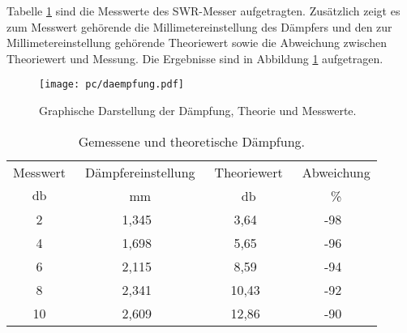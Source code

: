 Tabelle \ref{tab:SWR_Daempfung} sind die Messwerte des SWR-Messer aufgetragten.
Zusätzlich zeigt es zum Messwert gehörende die Millimetereinstellung des Dämpfers und den zur Millimetereinstellung gehörende Theoriewert sowie die Abweichung zwischen Theoriewert und Messung.
Die Ergebnisse sind in Abbildung \ref{plt:daempfung} aufgetragen.
\begin{figure}
\centering
\texttt{[image: pc/daempfung.pdf]}
\caption{Graphische Darstellung der Dämpfung, Theorie und Messwerte.}
\label{plt:daempfung}
\end{figure}
\begin{table}
\centering
\caption{Gemessene und theoretische Dämpfung.}
\begin{tabular}{cccc}
	\toprule
	Messwert& \
	Dämpfereinstellung& \
	Theoriewert& \
	Abweichung \\
	$\si{\decibel}$& \
	$\si{\milli\meter}$& \
	$\si{\decibel}$& \
	\%\\
	\midrule
		2&  1,345&   3,64&-98\\
		4&  1,698&   5,65&-96\\
		6&  2,115&   8,59&-94\\
		8&  2,341&  10,43&-92\\
		10& 2,609&  12,86&-90\\
	\bottomrule
\end{tabular}
\label{tab:SWR_Daempfung}
\end{table}

